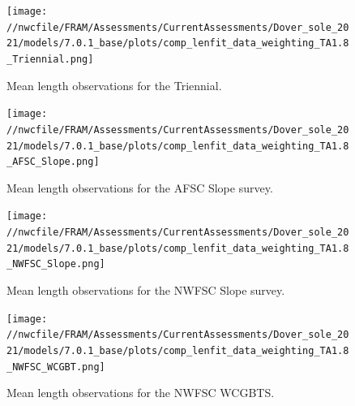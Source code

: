 \documentclass[11pt,
  english,
  a4paper,
]{article}
\begin{document}
\tagmcend\tagstructend


\begin{figure}
\centering
\texttt{[image: //nwcfile/FRAM/Assessments/CurrentAssessments/Dover\_sole\_2021/models/7.0.1\_base/plots/comp\_lenfit\_data\_weighting\_TA1.8\_Triennial.png]}
\caption{Mean length observations for the Triennial.\label{fig:tri-mean-len}}
\end{figure}

\tagmcend\tagstructend


\begin{figure}
\centering
\texttt{[image: //nwcfile/FRAM/Assessments/CurrentAssessments/Dover\_sole\_2021/models/7.0.1\_base/plots/comp\_lenfit\_data\_weighting\_TA1.8\_AFSC\_Slope.png]}
\caption{Mean length observations for the AFSC Slope survey.\label{fig:afsc-mean-len}}
\end{figure}

\tagmcend\tagstructend


\begin{figure}
\centering
\texttt{[image: //nwcfile/FRAM/Assessments/CurrentAssessments/Dover\_sole\_2021/models/7.0.1\_base/plots/comp\_lenfit\_data\_weighting\_TA1.8\_NWFSC\_Slope.png]}
\caption{Mean length observations for the NWFSC Slope survey.\label{fig:nwslope-mean-len}}
\end{figure}

\tagmcend\tagstructend


\begin{figure}
\centering
\texttt{[image: //nwcfile/FRAM/Assessments/CurrentAssessments/Dover\_sole\_2021/models/7.0.1\_base/plots/comp\_lenfit\_data\_weighting\_TA1.8\_NWFSC\_WCGBT.png]}
\caption{Mean length observations for the NWFSC WCGBTS.\label{fig:wcgbt-mean-len}}
\end{figure}

\tagmcend\tagstructend

\end{document}
